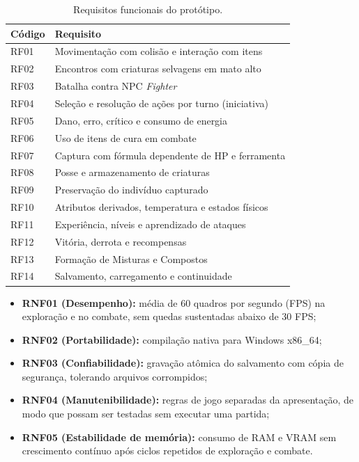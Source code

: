 \begin{table}[!h]
\caption{Requisitos funcionais do protótipo.}
\label{tab:rf}
\centering
\footnotesize
\begin{tabular}{@{}p{0.9cm}p{6.8cm}@{}}
\hline
\textbf{Código} & \textbf{Requisito} \\
\hline
RF01 & Movimentação com colisão e interação com itens \\
RF02 & Encontros com criaturas selvagens em mato alto \\
RF03 & Batalha contra NPC \textit{Fighter} \\
RF04 & Seleção e resolução de ações por turno (iniciativa) \\
RF05 & Dano, erro, crítico e consumo de energia \\
RF06 & Uso de itens de cura em combate \\
RF07 & Captura com fórmula dependente de HP e ferramenta \\
RF08 & Posse e armazenamento de criaturas \\
RF09 & Preservação do indivíduo capturado \\
RF10 & Atributos derivados, temperatura e estados físicos \\
RF11 & Experiência, níveis e aprendizado de ataques \\
RF12 & Vitória, derrota e recompensas \\
RF13 & Formação de Misturas e Compostos \\
RF14 & Salvamento, carregamento e continuidade \\
\hline
\end{tabular}
\end{table}

\begin{itemize}
    \item \textbf{RNF01 (Desempenho):} média de 60 quadros por segundo (FPS) na exploração e no combate, sem quedas sustentadas abaixo de 30 FPS;
    \item \textbf{RNF02 (Portabilidade):} compilação nativa para Windows x86\_64;
    \item \textbf{RNF03 (Confiabilidade):} gravação atômica do salvamento com cópia de segurança, tolerando arquivos corrompidos;
    \item \textbf{RNF04 (Manutenibilidade):} regras de jogo separadas da apresentação, de modo que possam ser testadas sem executar uma partida;
    \item \textbf{RNF05 (Estabilidade de memória):} consumo de RAM e VRAM sem crescimento contínuo após ciclos repetidos de exploração e combate.
\end{itemize}


